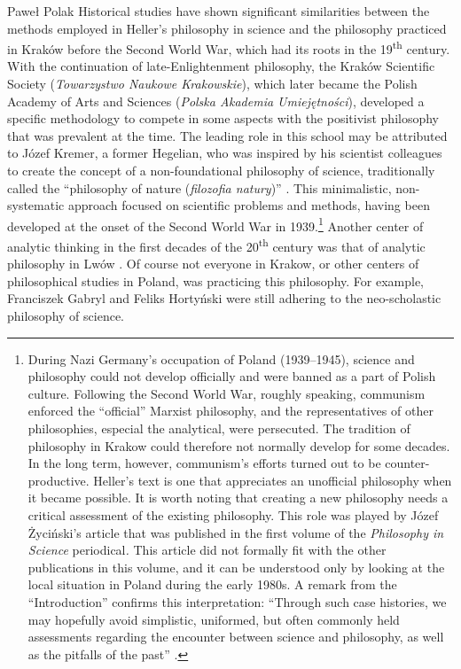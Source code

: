 \begin{artengenv}{Paweł Polak}
Historical studies have shown significant similarities between the methods employed in Heller’s philosophy in science
and the philosophy practiced in Kraków before the Second World War, which had its roots in the 19\textsuperscript{th}
century. With the continuation of late-Enlightenment philosophy, the Kraków Scientific Society (\textit{Towarzystwo Naukowe
Krakowskie}), which later became the Polish Academy of Arts and Sciences (\textit{Polska Akademia Umiejętności}),
developed a specific methodology to compete in some aspects with the positivist philosophy that was prevalent at the
time. The leading role in this school may be attributed to Józef Kremer, a former Hegelian, who was inspired by his
scientist colleagues to create the concept of a non-foundational philosophy of science, traditionally called the
``philosophy of nature (\textit{filozofia natury})''
\parencite{pol_polak_miedzy_2019}.
This minimalistic, non-systematic approach focused on
scientific problems and methods, having been developed at the onset of the Second World War in 1939.\footnote{During
Nazi Germany’s occupation of Poland (1939–1945), science and philosophy could not develop officially and were banned as
a part of Polish culture. Following the Second World War, roughly speaking, communism enforced the ``official'' Marxist
philosophy, and the representatives of other philosophies, especial the analytical, were persecuted. The tradition of
philosophy in Krakow could therefore not normally develop for some decades. In the long term, however, communism’s
efforts turned out to be counter-productive. Heller’s text is one that appreciates an unofficial philosophy when it
became possible. It is worth noting that creating a new philosophy needs a critical assessment of the existing
philosophy. This role was played by Józef Życiński's article that was published in the first volume of the
\textit{Philosophy in Science }periodical\textit{.} This article did not formally fit with the other publications in
this volume, and it can be understood only by looking at the local situation in Poland during the early 1980s. A remark
from the ``Introduction'' confirms this interpretation: ``Through such case histories, we may hopefully avoid simplistic,
uniformed, but often commonly held assessments regarding the encounter between science and philosophy, as well as the
pitfalls of the past''
\parencite[p.19]{pol_heller_introduction_1983}.
} Another center of analytic
thinking in the first decades of the 20\textsuperscript{th} century was that of analytic philosophy in Lwów
\parencite{pol_polak_philosophy_2016,pol_wolenski_lvov-warsaw_2019}.
Of course not everyone in Krakow, or other centers of philosophical studies in Poland, was
practicing this philosophy. For example, Franciszek Gabryl and Feliks Hortyński were still adhering to the
neo-scholastic philosophy of science.


\end{artengenv}

